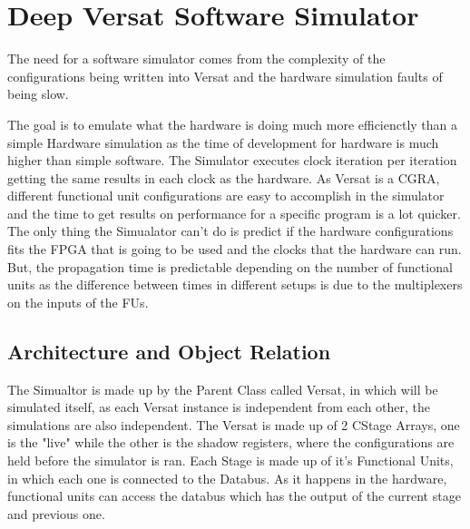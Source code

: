 \chapter{Deep Versat Software Simulator}
\label{chapter:Simulator}

The need for a software simulator comes from the complexity of the configurations being written into Versat and
the hardware simulation faults of being slow.

The goal is to emulate what the hardware is doing much more efficienctly than 
a simple Hardware simulation as the time of development for hardware
is much higher than simple software. The Simulator executes clock iteration per iteration 
getting the same results in each clock as the hardware. As Versat is a CGRA, different functional
unit configurations are easy to accomplish in the simulator and the time to get results on performance
for a specific program is a lot quicker. The only thing the Simualator can't do is predict
if the hardware configurations fits the FPGA that is going to be used and the clocks that 
the hardware can run. But, the propagation time is predictable depending on the number of functional units
as the difference between times in different setups is due to the multiplexers on the inputs of the FUs.

\section{Architecture and Object Relation}

The Simualtor is made up by the Parent Class called Versat, in which will be simulated itself, 
as each Versat instance is independent from each other, the simulations are also independent.
The Versat is made up of 2 CStage Arrays, one is the "live" while the other is the 
shadow registers, where the configurations are held before the simulator is ran.
Each Stage is made up of it's Functional Units, in which each one is connected to the Databus.
As it happens in the hardware, functional units can access the databus which has the output 
of the current stage and previous one.
\clearpage

